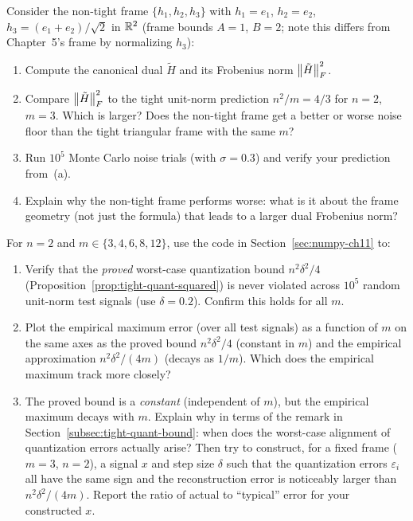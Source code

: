 \begin{exercisebox}[title={Lab Exercise 11.2: Non-Tight Frame Penalty}]
Consider the non-tight frame $\{h_1,h_2,h_3\}$ with $h_1=e_1$,
$h_2=e_2$, $h_3=(e_1+e_2)/\sqrt{2}$ in $\mathbb{R}^2$ (frame bounds $A=1$,
$B=2$; note this differs from Chapter~5's frame by normalizing $h_3$):
\begin{enumerate}[label=(\alph*)]
  \item Compute the canonical dual $\tilde H$ and its Frobenius norm
        $\left\| \tilde H \right\|_F^2$.
  \item Compare $\left\| \tilde H \right\|_F^2$ to the tight unit-norm prediction
        $n^2/m = 4/3$ for $n=2$, $m=3$. Which is larger? Does the
        non-tight frame get a better or worse noise floor than the
        tight triangular frame with the same $m$?
  \item Run $10^5$ Monte Carlo noise trials (with $\sigma=0.3$) and
        verify your prediction from~(a).
  \item Explain why the non-tight frame performs worse: what is it
        about the frame geometry (not just the formula) that leads to
        a larger dual Frobenius norm?
\end{enumerate}
\end{exercisebox}

\begin{exercisebox}[title={Lab Exercise 11.3: Quantization Simulation}]
For $n=2$ and $m \in \{3,4,6,8,12\}$, use the code in
Section~\ref{sec:numpy-ch11} to:
\begin{enumerate}[label=(\alph*)]
  \item Verify that the \emph{proved} worst-case quantization bound
        $n^2\delta^2/4$ (Proposition~\ref{prop:tight-quant-squared}) is
        never violated across $10^5$ random unit-norm test signals
        (use $\delta=0.2$). Confirm this holds for all $m$.
  \item Plot the empirical maximum error (over all test signals) as a
        function of $m$ on the same axes as the proved bound
        $n^2\delta^2/4$ (constant in $m$) and the empirical approximation
        $n^2\delta^2/(4m)$ (decays as $1/m$). Which does the empirical
        maximum track more closely?
  \item The proved bound is a \emph{constant} (independent of $m$), but
        the empirical maximum decays with $m$. Explain why in terms of the
        remark in Section~\ref{subsec:tight-quant-bound}: when does the
        worst-case alignment of quantization errors actually arise?
        Then try to construct, for a fixed frame ($m=3$, $n=2$), a signal
        $x$ and step size $\delta$ such that the quantization errors
        $\varepsilon_i$ all have the same sign and the reconstruction error
        is noticeably larger than $n^2\delta^2/(4m)$. Report the ratio
        of actual to ``typical'' error for your constructed $x$.
\end{enumerate}
\end{exercisebox}

